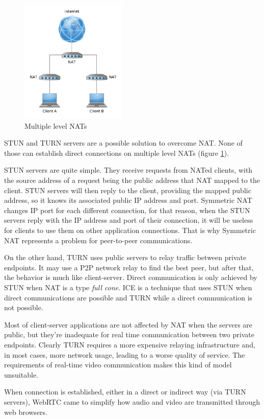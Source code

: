 \begin{figure}
	\centering
	\includegraphics[width=0.45\textwidth]{figures/multinat.pdf}
	\caption{Multiple level NATs}
	\label{fig:multinat}
\end{figure}

\ac{STUN} and \ac{TURN} \cite{natvoip} servers are a possible solution to overcome \ac{NAT}. None of those can establish direct connections on multiple level \ac{NAT}s (figure \ref{fig:multinat}).

\ac{STUN} servers are quite simple. They receive requests from \ac{NAT}ed clients, with the source address of a request being the public address that \ac{NAT} mapped to the client. \ac{STUN} servers will then reply to the client, providing the mapped public address, so it knows its associated public \ac{IP} address and port. Symmetric \ac{NAT} changes \ac{IP} port for each different connection, for that reason, when the \ac{STUN} servers reply with the \ac{IP} address and port of their connection, it will be useless for clients to use them on other application connections. That is why Symmetric \ac{NAT} represents a problem for peer-to-peer communications.   

On the other hand, \ac{TURN} uses public servers to relay traffic between private endpoints.
It may use a \ac{P2P} network relay to find the best peer, but after that, the behavior is much like client-server. Direct communication is only achieved by \ac{STUN} when \ac{NAT} is a type \emph{full cone}. \ac{ICE} is a technique that uses \ac{STUN} when direct communications are possible and \ac{TURN} while a direct communication is not possible.

Most of client-server applications are not affected by \ac{NAT} when the servers are public, but they're inadequate for real time communication between two private endpoints. Clearly \ac{TURN} requires a more expensive relaying infrastructure and, in most cases, more network usage, leading to a worse quality of service. The requirements of real-time video communication makes this kind of model unsuitable.

When connection is established, either in a direct or indirect way (via \ac{TURN} servers), \ac{WebRTC} came to simplify how audio and video are transmitted through web browsers.
